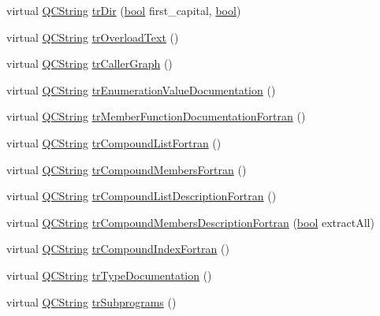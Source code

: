 \begin{DoxyCompactItemize}
virtual \hyperlink{class_q_c_string}{Q\+C\+String} \hyperlink{class_translator_italian_a419b502c4fc1c36dcda3fc0bd1bd6a33}{tr\+Dir} (\hyperlink{qglobal_8h_a1062901a7428fdd9c7f180f5e01ea056}{bool} first\+\_\+capital, \hyperlink{qglobal_8h_a1062901a7428fdd9c7f180f5e01ea056}{bool})
\item 
virtual \hyperlink{class_q_c_string}{Q\+C\+String} \hyperlink{class_translator_italian_a13707f53da74bddea1e2a365e3c381e0}{tr\+Overload\+Text} ()
\item 
virtual \hyperlink{class_q_c_string}{Q\+C\+String} \hyperlink{class_translator_italian_aa203560a69ac79dea8736cc4b77e217d}{tr\+Caller\+Graph} ()
\item 
virtual \hyperlink{class_q_c_string}{Q\+C\+String} \hyperlink{class_translator_italian_a7988405bff5d4d2e991928eae3403dc9}{tr\+Enumeration\+Value\+Documentation} ()
\item 
virtual \hyperlink{class_q_c_string}{Q\+C\+String} \hyperlink{class_translator_italian_a328b5e0aa818391336e3cd8dcaef3420}{tr\+Member\+Function\+Documentation\+Fortran} ()
\item 
virtual \hyperlink{class_q_c_string}{Q\+C\+String} \hyperlink{class_translator_italian_ac19386644a5f5f99a5ebcf86bf3a2223}{tr\+Compound\+List\+Fortran} ()
\item 
virtual \hyperlink{class_q_c_string}{Q\+C\+String} \hyperlink{class_translator_italian_acab289997cda5bb70b87379b990eb038}{tr\+Compound\+Members\+Fortran} ()
\item 
virtual \hyperlink{class_q_c_string}{Q\+C\+String} \hyperlink{class_translator_italian_a9c602fe1e41edc84b37a94cec44145a3}{tr\+Compound\+List\+Description\+Fortran} ()
\item 
virtual \hyperlink{class_q_c_string}{Q\+C\+String} \hyperlink{class_translator_italian_a539ce79f5dcf69caa854b7425a2146e0}{tr\+Compound\+Members\+Description\+Fortran} (\hyperlink{qglobal_8h_a1062901a7428fdd9c7f180f5e01ea056}{bool} extract\+All)
\item 
virtual \hyperlink{class_q_c_string}{Q\+C\+String} \hyperlink{class_translator_italian_a07e7bc2eeca3c972c0b39ec248adf59c}{tr\+Compound\+Index\+Fortran} ()
\item 
virtual \hyperlink{class_q_c_string}{Q\+C\+String} \hyperlink{class_translator_italian_a0a2e11ea861fed4174f8a9095cf3d763}{tr\+Type\+Documentation} ()
\item 
virtual \hyperlink{class_q_c_string}{Q\+C\+String} \hyperlink{class_translator_italian_a209a6eba3a7a896e7848fea453ec84a8}{tr\+Subprograms} ()
\item 

\end{DoxyCompactItemize}
